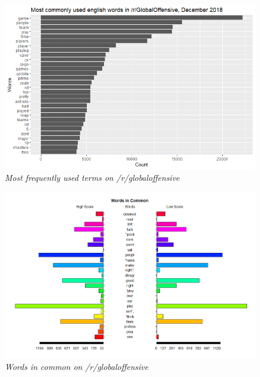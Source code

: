 \begin{figure}[H]
    \centering
    \includegraphics[width=1.0\textwidth]{graphs/GlobalOffensive/WordFreq_GlobalOffensive.png}
    \caption{\textit{Most frequently used terms on /r/globaloffensive}}
    \label{fig:go_wordfreq}
\end{figure}

\begin{figure}[H]
    \centering
    \includegraphics[width=1.0\textwidth]{graphs/GlobalOffensive/Pyramid_GlobalOffensive.png}
    \caption{\textit{Words in common on /r/globaloffensive}}
    \label{fig:go_pyramid}
\end{figure}


